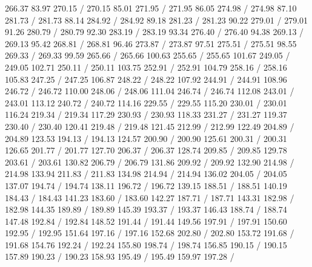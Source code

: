 { 266.37 83.97 270.15 /
 270.15 85.01 271.95 /
 271.95 86.05 274.98 /
 274.98 87.10 281.73 /
 281.73 88.14 284.92 /
 284.92 89.18 281.23 /
 281.23 90.22 279.01 /
 279.01 91.26 280.79 /
 280.79 92.30 283.19 /
 283.19 93.34 276.40 /
 276.40 94.38 269.13 /
 269.13 95.42 268.81 /
 268.81 96.46 273.87 /
 273.87 97.51 275.51 /
 275.51 98.55 269.33 /
 269.33 99.59 265.66 /
 265.66 100.63 255.65 /
 255.65 101.67 249.05 /
 249.05 102.71 250.11 /
 250.11 103.75 252.91 /
 252.91 104.79 258.16 /
 258.16 105.83 247.25 /
 247.25 106.87 248.22 /
 248.22 107.92 244.91 /
 244.91 108.96 246.72 /
 246.72 110.00 248.06 /
 248.06 111.04 246.74 /
 246.74 112.08 243.01 /
 243.01 113.12 240.72 /
 240.72 114.16 229.55 /
 229.55 115.20 230.01 /
 230.01 116.24 219.34 /
 219.34 117.29 230.93 /
 230.93 118.33 231.27 /
 231.27 119.37 230.40 /
 230.40 120.41 219.48 /
 219.48 121.45 212.99 /
 212.99 122.49 204.89 /
 204.89 123.53 194.13 /
 194.13 124.57 200.90 /
 200.90 125.61 200.31 /
 200.31 126.65 201.77 /
 201.77 127.70 206.37 /
 206.37 128.74 209.85 /
 209.85 129.78 203.61 /
 203.61 130.82 206.79 /
 206.79 131.86 209.92 /
 209.92 132.90 214.98 /
 214.98 133.94 211.83 /
 211.83 134.98 214.94 /
 214.94 136.02 204.05 /
 204.05 137.07 194.74 /
 194.74 138.11 196.72 /
 196.72 139.15 188.51 /
 188.51 140.19 184.43 /
 184.43 141.23 183.60 /
 183.60 142.27 187.71 /
 187.71 143.31 182.98 /
 182.98 144.35 189.89 /
 189.89 145.39 193.37 /
 193.37 146.43 188.74 /
 188.74 147.48 192.84 /
 192.84 148.52 191.44 /
 191.44 149.56 197.91 /
 197.91 150.60 192.95 /
 192.95 151.64 197.16 /
 197.16 152.68 202.80 /
 202.80 153.72 191.68 /
 191.68 154.76 192.24 /
 192.24 155.80 198.74 /
 198.74 156.85 190.15 /
 190.15 157.89 190.23 /
 190.23 158.93 195.49 /
 195.49 159.97 197.28 /
}
